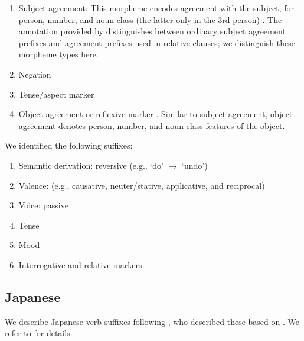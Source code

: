 \documentclass[11pt,letterpaper]{article}
\begin{document}
\begin{enumerate}
    \item Subject agreement: This morpheme encodes agreement with the subject, for person, number, and noun class (the latter only in the 3rd person) \cite[]{doke1967textbook}.
            The annotation provided by \cite{demuth1992acquisition} distinguishes between ordinary subject agreement prefixes and agreement prefixes used in relative clauses; we distinguish these morpheme types here.

    \item Negation \citep[]{doke1967textbook}

    \item Tense/aspect marker   \citep[--424]{doke1967textbook}

    \item Object agreement or reflexive marker \citep[]{doke1967textbook}.
    Similar to subject agreement, object agreement denotes person, number, and noun class features of the object.
\end{enumerate}
We identified the following suffixes:

\begin{enumerate}
\item Semantic derivation: reversive (e.g., `do' $\rightarrow$ `undo')
\item Valence: (e.g., causative, neuter/stative, applicative, and reciprocal)
    \item Voice: passive
    \item Tense
    \item Mood
    \item Interrogative and relative markers
\end{enumerate}

\subsection{Japanese}

We describe Japanese verb suffixes following \citep{Hahn2020modeling}, who described these based on \citep{kaiser2013japanese,hasegawa2014japanese}.
We refer to \citep{Hahn2020modeling} for details.
\end{document}
